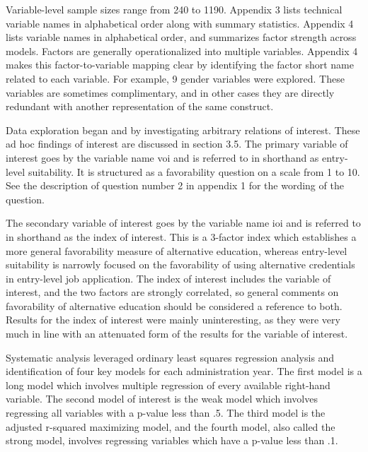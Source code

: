 \documentclass[AER]{/Users/zyl357/Documents/GitHub/research-dissertation-case-for-alt-ed/papers/alt-ed-survey/aea-latex-templates/AEA}
\begin{document}
Variable-level sample sizes range from 240 to 1190. Appendix 3 lists
technical variable names in alphabetical order along with summary
statistics. Appendix 4 lists variable names in alphabetical order, and
summarizes factor strength across models. Factors are generally
operationalized into multiple variables. Appendix 4 makes this
factor-to-variable mapping clear by identifying the factor short name
related to each variable. For example, 9 gender variables were explored.
These variables are sometimes complimentary, and in other cases they are
directly redundant with another representation of the same construct.

Data exploration began and by investigating arbitrary relations of
interest. These ad hoc findings of interest are discussed in section 3.5.
The primary variable of interest goes by the variable name voi and is
referred to in shorthand as entry-level suitability. It is structured as a
favorability question on a scale from 1 to 10. See the description of
question number 2 in appendix 1 for the wording of the question.

The secondary variable of interest goes by the variable name ioi and is
referred to in shorthand as the index of interest. This is a 3-factor
index which establishes a more general favorability measure of alternative
education, whereas entry-level suitability is narrowly focused on the
favorability of using alternative credentials in entry-level job
application. The index of interest includes the variable of interest, and
the two factors are strongly correlated, so general comments on
favorability of alternative education should be considered a reference to
both. Results for the index of interest were mainly uninteresting, as they
were very much in line with an attenuated form of the results for the
variable of interest.

Systematic analysis leveraged ordinary least squares regression analysis
and identification of four key models for each administration year. The
first model is a long model which involves multiple regression of every
available right-hand variable. The second model of interest is the weak
model which involves regressing all variables with a p-value less than .5.
The third model is the adjusted r-squared maximizing model, and the fourth
model, also called the strong model, involves regressing variables which
have a p-value less than .1.
\end{document}

